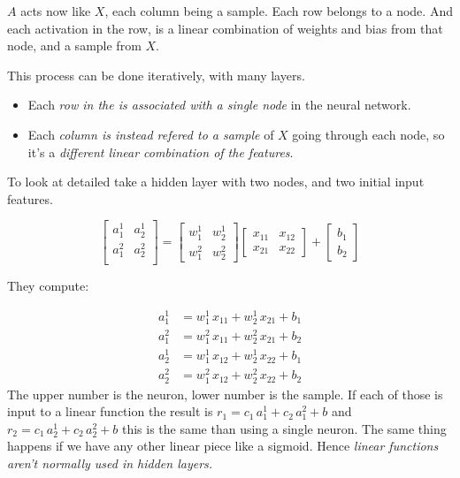 $A$ acts now like $X$, each column being a sample. Each row belongs to a node. And each activation in the row, is a linear combination of weights and bias from that node, and a sample from $X$.

This process can be done iteratively, with many layers.
\begin{itemize}
  \item Each \textit{row in the is associated with a single node} in the neural network. 
  \item Each \textit{column is instead refered to a sample} of $X$ going through each node, so it's a \textit{different linear combination of the features}. 
\end{itemize}

To look at detailed take a hidden layer with two nodes, and two initial input features.

\begin{equation*}
  \begin{bmatrix}
    a_1^1 & a_2^1\\
    a_1^2 & a_2^2\\
  \end{bmatrix}
  = 
  \begin{bmatrix}
    w_1^1& w_2^1\\
    w_1^2& w_2^2
  \end{bmatrix}
  \begin{bmatrix}
    x_{11} & x_{12}\\
    x_{21} & x_{22} 
  \end{bmatrix}
  + \begin{bmatrix}b_1\\ b_2\end{bmatrix}
\end{equation*}

They compute:

\begin{align*}
  a_1^1 &= w_1^1\,x_{11} + w_2^1\,x_{21} + b_1\\
  a^2_1 &= w_1^2\,x_{11} + w_2^2\,x_{21} + b_2\\
  a_2^1 &= w_1^1\,x_{12} + w_2^1\,x_{22} + b_1 \\
  a_2^2 &= w_1^2\,x_{12} + w_2^2\,x_{22} + b_2
\end{align*}
The upper number is the neuron, lower number is the sample. If each of those is input to a linear function the result is $r_1 = c_1\,a_1^1 + c_2\, a_1^2 + b$ and $r_2 = c_1\,a_2^1 + c_2\, a_2^2+b$ this is the same than using a single neuron. The same thing happens if we have any other linear piece like a sigmoid. Hence \textit{linear functions aren't normally used in hidden layers.}


